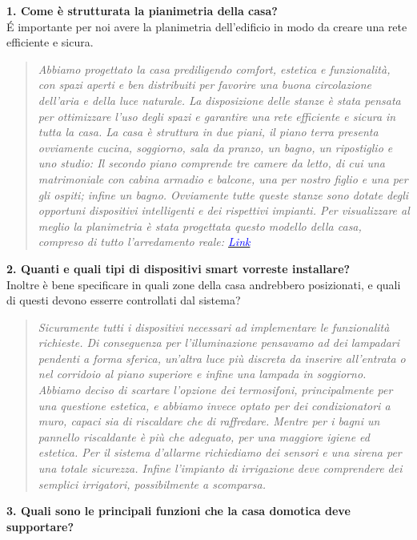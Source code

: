 \documentclass{exam}
\begin{document}
\clearpage
\noindent\textbf{1. Come è strutturata la pianimetria della casa?}\\[1.5mm]
É importante per noi avere la planimetria dell'edificio in modo da creare una rete efficiente e sicura.\\
\begin{quote}
    \emph{Abbiamo progettato la casa prediligendo comfort, estetica e funzionalità, con spazi aperti e ben distribuiti per favorire una buona circolazione dell'aria e della luce naturale. La disposizione delle stanze è stata pensata per ottimizzare l'uso degli spazi e garantire una rete efficiente e sicura in tutta la casa. La casa è struttura in due piani, il piano terra presenta ovviamente cucina, soggiorno, sala da pranzo, un bagno, un ripostiglio e uno studio: Il secondo piano comprende tre camere da letto, di cui una matrimoniale con cabina armadio e balcone, una per nostro figlio e una per gli ospiti; infine un bagno. Ovviamente tutte queste stanze sono dotate degli opportuni dispositivi intelligenti e dei rispettivi impianti. Per visualizzare al meglio la planimetria è stata progettata questo modello della casa, compreso di tutto l'arredamento reale: \href{https://gallery.roomsketcher.com/project/?l=en&pid=14670259}{\textcolor{blue}{Link}}
    }
\end{quote}
\clearpage
\noindent\textbf{2. Quanti e quali tipi di dispositivi smart vorreste installare?}\\[1.5mm]
Inoltre è bene specificare in quali zone della casa andrebbero posizionati, e quali di questi devono esserre controllati dal sistema?\\
\begin{quote}
    \emph{Sicuramente tutti i dispositivi necessari ad implementare le funzionalità richieste. Di conseguenza per l'illuminazione pensavamo ad dei lampadari pendenti a forma sferica, un'altra luce più discreta da inserire all'entrata o nel corridoio al piano superiore e infine una lampada in soggiorno. Abbiamo deciso di scartare l'opzione dei termosifoni, principalmente per una questione estetica, e abbiamo invece optato per dei condizionatori a muro, capaci sia di riscaldare che di raffredare. Mentre per i bagni un pannello riscaldante è più che adeguato, per una maggiore igiene ed estetica. Per il sistema d'allarme richiediamo dei sensori e una sirena per una totale sicurezza. Infine l'impianto di irrigazione deve comprendere dei semplici irrigatori, possibilmente a scomparsa.}
\end{quote}
\clearpage
\noindent\textbf{3. Quali sono le principali funzioni che la casa domotica deve supportare?}\\[1.5mm]
\end{document}
